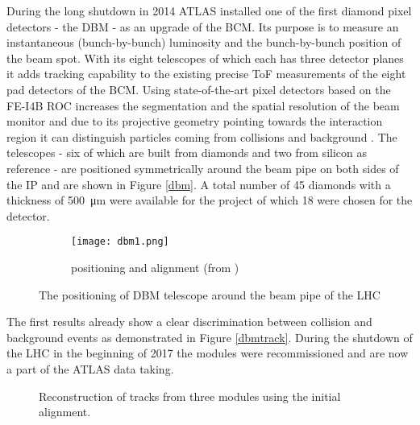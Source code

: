 During the long shutdown in 2014 ATLAS installed one of the first diamond pixel detectors - the \ac{DBM} - as an upgrade of the \ac{BCM}. Its purpose is to measure an instantaneous (bunch-by-bunch) luminosity and the bunch-by-bunch position of the beam spot. With its eight telescopes of which each has three detector planes it adds tracking capability to the existing precise \ac{ToF} measurements of the eight pad detectors of the \ac{BCM}. Using state-of-the-art pixel detectors based on the FE-I4B \ac{ROC} \cite{malte} increases the segmentation and the spatial resolution of the beam monitor and due to its projective geometry pointing towards the interaction region it can distinguish particles coming from collisions and background \cite{dbm}. The telescopes - six of which are built from \pcvd diamonds and two from silicon as reference - are positioned symmetrically around the beam pipe on both sides of the \ac{IP} and are shown in Figure \vref{dbm}. A total number of 45 diamonds with a thickness of \SI{500}{\micro\meter} were available for the project of which 18 were chosen for the detector.

\begin{figure}
	\centering
	\begin{subfigure}{.66\textwidth}
		\centering
		\vspace*{.05\textheight}
		\texttt{[image: dbm1.png]}
		\vspace*{.02\textheight}
		\caption{positioning and alignment (from \cite{dbm})}
	\end{subfigure}
	\caption{The positioning of \ac{DBM} telescope around the beam pipe of the \ac{LHC}}
	\label{dbm}
\end{figure}

\noindent
The first results already show a clear discrimination between collision and background events as demonstrated in Figure \vref{dbmtrack}. During the shutdown of the \ac{LHC} in the beginning of 2017 the modules were recommissioned and are now a part of the ATLAS data taking.

\begin{figure}
	\centering
	\caption{Reconstruction of tracks from three modules using the initial alignment.}
	\label{dbmtrack}
\end{figure}

